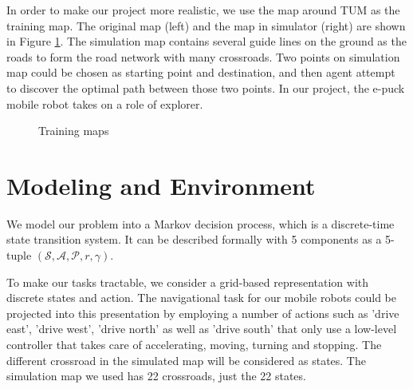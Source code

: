 \documentclass[a4paper, 11pt]{article} %
\begin{document}
In order to make our project more realistic, we use the map around TUM as the
training map. 
The original map (left) and the map in simulator (right) are shown
in Figure \ref{fig1}. The simulation map contains several guide lines on the
ground as the roads to form the road network with many crossroads. Two points on
simulation map could be chosen as starting point and destination, and then agent
attempt to discover the optimal path between those two points. In our project,
the e-puck mobile robot takes on a role of explorer.
\begin{figure}[tbp]
\centering
{}
\caption{Training maps}
\label{fig1}
\end{figure}


\section{Modeling and Environment}
We model our problem into a Markov decision process, which is a discrete-time state transition system. It can be described formally with 5 components as a 5-tuple $(\mathcal{S,A,P}, r,\gamma)$. 

To make our tasks tractable, we consider a grid-based representation with discrete
states and action. The navigational task for our mobile robots could be projected
into this presentation by employing a number of actions such as 'drive east',
'drive west', 'drive north' as well as 'drive south' that only use a low-level
controller that takes care of accelerating, moving, turning and stopping. The
different crossroad in the simulated map will be considered as states. The simulation
map we used has 22 crossroads, just the 22 states. 
\end{document}
